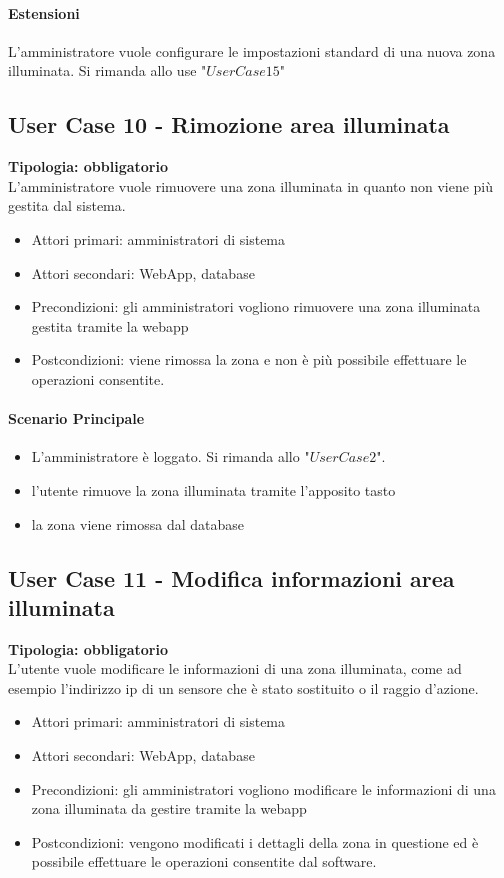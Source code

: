 \documentclass[12pt]{article}
\begin{document}
\paragraph{Estensioni} L'amministratore vuole configurare le impostazioni standard di una nuova zona illuminata. Si rimanda allo use "$User Case 15$"

\subsection{User Case 10 - Rimozione area illuminata}
\textbf{Tipologia: obbligatorio} \\
L'amministratore vuole rimuovere una zona illuminata in quanto non viene più gestita dal sistema.
\begin{itemize}
	\item Attori primari: amministratori di sistema
	\item Attori secondari: WebApp, database
	\item Precondizioni: gli amministratori vogliono rimuovere una zona illuminata gestita tramite la webapp
	\item Postcondizioni: viene rimossa la zona e non è più possibile effettuare le operazioni consentite.
\end{itemize}
\paragraph{Scenario Principale}
\begin{itemize}
	\item L'amministratore è loggato. Si rimanda allo "$User Case 2$".
	\item l'utente rimuove la zona illuminata tramite l'apposito tasto
	\item la zona viene rimossa dal database 
\end{itemize}

\subsection{User Case 11 - Modifica informazioni area illuminata}
\textbf{Tipologia: obbligatorio} \\
L'utente vuole modificare le informazioni di una zona illuminata, come ad esempio l'indirizzo ip di un sensore che è stato sostituito o il raggio d'azione.
\begin{itemize}
	\item Attori primari: amministratori di sistema
	\item Attori secondari: WebApp, database
	\item Precondizioni: gli amministratori vogliono modificare le informazioni di una  zona illuminata da gestire tramite la webapp
	\item Postcondizioni: vengono modificati i dettagli della zona in questione ed è possibile effettuare le operazioni consentite dal software.
\end{itemize}
\end{document}
